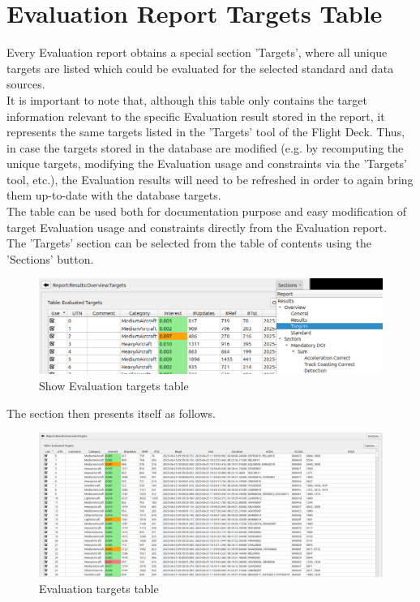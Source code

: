 
\section{Evaluation Report Targets Table}
\label{sec:eval_report_targets}

Every Evaluation report obtains a special section 'Targets', where all unique targets 
are listed which could be evaluated for the selected standard and data sources. \\

It is important to note that, although this table only contains the target information relevant to the specific Evaluation result stored in the report,
it represents the same targets listed in the 'Targets' tool of the Flight Deck. 
Thus, in case the targets stored in the database are modified (e.g. by recomputing the unique targets, modifying the Evaluation usage and constraints via the 'Targets' tool, etc.), 
the Evaluation results will need to be refreshed in order to again bring them up-to-date with the database targets. \\

The table can be used both for documentation purpose and easy modification of target Evaluation usage and 
constraints directly from the Evaluation report. \\

The 'Targets' section can be selected from the table of contents using the 'Sections' button.

\begin{figure}[H]
  \hspace*{-2cm}
  \center
    \includegraphics[width=15cm,frame]{figures/eval_targets_section.png}
  \caption{Show Evaluation targets table}
\end{figure}

The section then presents itself as follows.

\begin{figure}[H]
  \hspace*{-2cm}
  \center
    \includegraphics[width=17cm,frame]{figures/eval_targets_table.png}
  \caption{Evaluation targets table}
\end{figure}


